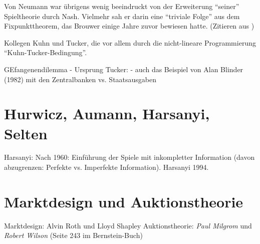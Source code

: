 Von Neumann war übrigens wenig beeindruckt von der Erweiterung "`seiner"' Spieltheorie durch Nash. Vielmehr sah er darin eine "`triviale Folge"' aus dem Fixpunkttheorem, das Brouwer einige Jahre zuvor bewiesen hatte. (Zitieren aus \textcite{Cassidy2015} )

Kollegen Kuhn und Tucker, die vor allem durch die nicht-lineare Programmierung "`Kuhn-Tucker-Bedingung"'.


GEfangenendilemma - Ursprung Tucker: \parencite[S. 161]{Nash1994} - auch das Beispiel von Alan Blinder (1982) mit den Zentralbanken vs. Staatsausgaben











\section{Hurwicz, Aumann, Harsanyi, Selten}

Harsanyi: Nach 1960: Einführung der Spiele mit inkompletter Information (davon abzugrenzen: Perfekte vs. Imperfekte Information). Harsanyi 1994. 

\section{Marktdesign und Auktionstheorie}

Marktdesign: Alvin Roth und Lloyd Shapley 
Auktionstheorie: \textit{Paul Milgrom} und \textit{Robert Wilson} (Seite 243 im Bernstein-Buch)



